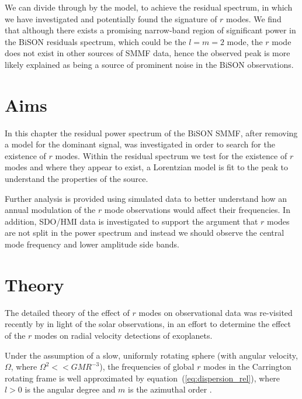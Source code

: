 We can divide through by the model, to achieve the residual spectrum, in which we have investigated and potentially found the signature of $r$ modes. We find that although there exists a promising narrow-band region of significant power in the BiSON residuals spectrum, which could be the $l=m=2$ mode, the $r$ mode does not exist in other sources of SMMF data, hence the observed peak is more likely explained as being a source of prominent noise in the BiSON observations.




\section{Aims}\label{sec:r-mode_aims}

In this chapter the residual power spectrum of the BiSON SMMF, after removing a model for the dominant signal, was investigated in order to search for the existence of $r$ modes. Within the residual spectrum we test for the existence of $r$ modes and where they appear to exist, a Lorentzian model is fit to the peak to understand the properties of the source.

Further analysis is provided using simulated data to better understand how an annual modulation of the $r$ mode observations would affect their frequencies. In addition, SDO/HMI data is investigated to support the argument that $r$ modes are not split in the power spectrum and instead we should observe the central mode frequency and lower amplitude side bands.



\section{Theory}\label{sec:r-mode_theory}

The detailed theory of the effect of $r$ modes on observational data was re-visited recently by \citet{lanza_sectoral_2019} in light of the solar observations, in an effort to determine the effect of the $r$ modes on radial velocity detections of exoplanets.

Under the assumption of a slow, uniformly rotating sphere (with angular velocity, $\Omega$, where $\Omega^2 << GMR^{-3}$), the frequencies of global $r$ modes in the Carrington rotating frame is well approximated by equation~(\ref{eq:dispersion_rel}), where $l > 0$ is the angular degree and $m$ is the azimuthal order \citep{loptien_global-scale_2018, lanza_sectoral_2019}.

